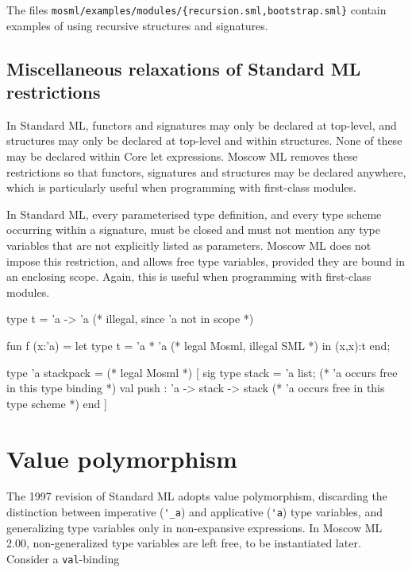 \documentclass[fleqn,a4paper]{article}
\begin{document}
\noindent The files {\tt mosml/examples/modules/\{recursion.sml,bootstrap.sml\}}
contain examples of using recursive structures and signatures.

\subsection{Miscellaneous relaxations of Standard ML restrictions}
\label{sec-misc-relaxations}

In Standard ML, functors and signatures may only be declared at
top-level, and structures may only be declared at top-level and within
structures.  None of these may be declared within Core let
expressions.  Moscow ML removes these restrictions so that functors,
signatures and structures may be declared anywhere, which is
particularly useful when programming with first-class modules.

In Standard ML, every parameterised type definition, and every type
scheme occurring within a signature, must be closed and must not
mention any type variables that are not explicitly listed as
parameters.  Moscow ML does not impose this restriction, and allows
free type variables, provided they are bound in an enclosing scope.
Again, this is useful when programming with first-class modules.

\begin{program}
type t = 'a -> 'a                                (* illegal, since 'a not in scope      *)

fun f (x:'a) = let type t = 'a * 'a              (* legal Mosml, illegal SML            *)
               in (x,x):t 
               end;

type 'a stackpack =                              (* legal Mosml                         *)
    [ sig                             
          type stack = 'a list;                  (* 'a occurs free in this type binding *)
          val push : 'a -> stack -> stack        (* 'a occurs free in this type scheme  *)
      end ]
\end{program}

\newpage

\section{Value polymorphism}
\label{sec-valuepoly}

The 1997 revision of Standard ML \cite{Milner:1997:TheDefinition}
adopts value polymorphism, discarding the distinction between
imperative (\verb#'_a#) and applicative (\verb#'a#) type variables,
and generalizing type variables only in non-expansive expressions.  In
Moscow ML 2.00, non-generalized type variables are left free, to be
instantiated later.  Consider a {\tt val}-binding
\end{document}
